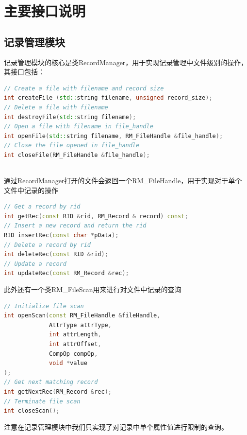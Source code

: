 \documentclass[11pt,UTF8]{report}
\begin{document}
\section{主要接口说明}
\subsection{记录管理模块}
记录管理模块的核心是类RecordManager，用于实现记录管理中文件级别的操作，其接口包括：
\begin{lstlisting}[language=C++]
// Create a file with filename and record size
int createFile (std::string filename, unsigned record_size);
// Delete a file with filename
int destroyFile(std::string filename);
// Open a file with filename in file_handle
int openFile(std::string filename, RM_FileHandle &file_handle);
// Close the file opened in file_handle
int closeFile(RM_FileHandle &file_handle);
​\end{lstlisting}

通过RecordManager打开的文件会返回一个RM\_FileHandle，用于实现对于单个文件中记录的操作
\begin{lstlisting}[language=C++]
// Get a record by rid
int getRec(const RID &rid, RM_Record & record) const;
// Insert a new record and return the rid
RID insertRec(const char *pData);
// Delete a record by rid
int deleteRec(const RID &rid);
// Update a record
int updateRec(const RM_Record &rec);
\end{lstlisting}

此外还有一个类RM\_FileScan用来进行对文件中记录的查询
\begin{lstlisting}[language=C++]
// Initialize file scan
int openScan(const RM_FileHandle &fileHandle,
             AttrType attrType,
             int attrLength,
             int attrOffset,
             CompOp compOp,
             void *value
);
// Get next matching record
int getNextRec(RM_Record &rec);
// Terminate file scan
int closeScan();
\end{lstlisting}

注意在记录管理模块中我们只实现了对记录中单个属性值进行限制的查询。
\end{document}
